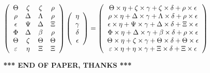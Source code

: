 \documentclass[12pt]{article}
\begin{document}
$  %
 \left( \begin{array}
 {
 c
 c
 c
 c
 }
 \Theta & 
                    \zeta & 
                    \zeta & 
 \rho \\ 
 \rho & 
 \Delta & 
 \Lambda & 
 \rho \\ 
 \epsilon & 
 \Psi & 
 \Delta & 
                    \Xi \\ 
 \Phi & 
 \Delta & 
 \beta & 
 \rho \\ 
 \Theta & 
                    \zeta & 
 \Theta & 
 \Theta \\ 
 \varepsilon & 
 \eta & 
                    \Xi & 
                    \Xi
 \end{array} \right)
 \left( \begin{array}
 {
 c
 }
 \eta \\ 
 \gamma \\ 
 \delta \\ 
 \epsilon
 \end{array} \right)
=
 \left( \begin{array}
 {
 c
 }
  \Theta \times  \eta +                     \zeta \times  \gamma +                     \zeta \times  \delta +  \rho \times  \epsilon \\ 
  \rho \times  \eta +  \Delta \times  \gamma +  \Lambda \times  \delta +  \rho \times  \epsilon \\ 
  \epsilon \times  \eta +  \Psi \times  \gamma +  \Delta \times  \delta +                     \Xi \times  \epsilon \\ 
  \Phi \times  \eta +  \Delta \times  \gamma +  \beta \times  \delta +  \rho \times  \epsilon \\ 
  \Theta \times  \eta +                     \zeta \times  \gamma +  \Theta \times  \delta +  \Theta \times  \epsilon \\ 
  \varepsilon \times  \eta +  \eta \times  \gamma +                     \Xi \times  \delta +                     \Xi \times  \epsilon
 \end{array} \right)
$
 
 
 
 
 
\noindent{}

 
 
   
   
 \vspace{0.2in}
 
   
   
   
   
\vspace{1.0in} 
{\textbf{\large{ *** END OF PAPER, THANKS *** }}} 
   
\end{document}
